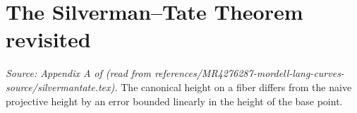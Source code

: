 \section{The Silverman--Tate Theorem revisited}

\begin{lemma}
  \label{thm:silverman_tate}
  \textit{Source: Appendix A of \cite{MR4276287-mordell-lang-curves} (read from references/MR4276287-mordell-lang-curves-source/silvermantate.tex).}
  The canonical height on a fiber differs from the naive projective height by an
  error bounded linearly in the height of the base point.
\end{lemma}

